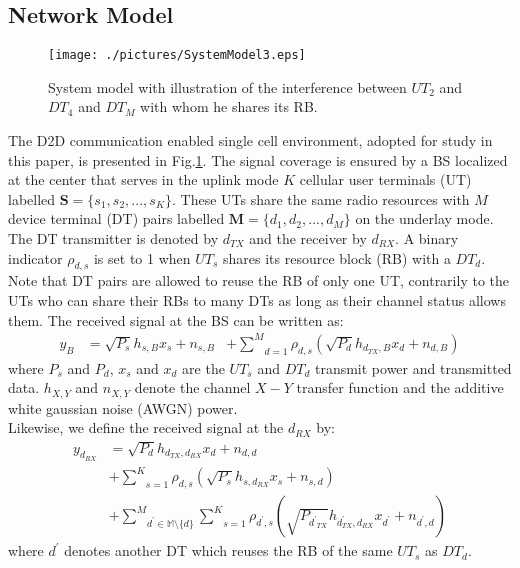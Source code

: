 \documentclass[conference,onecolumn,12pt]{IEEEtran}
\begin{document}
\subsection{Network Model}
\begin{figure}
\centering
\texttt{[image: ./pictures/SystemModel3.eps]}
\caption{System model with illustration of the interference between $UT_2$ and $DT_4$ and $DT_M$ with whom he shares its RB. }\label{SystemModel3}
\end{figure}
The D2D communication enabled single cell environment, adopted for study in this paper, is presented in Fig.\ref{SystemModel3}. The signal coverage is ensured by a BS localized at the center that serves in the uplink mode $K$ cellular user terminals (UT) labelled $\mathbf{S}=\{s_{1},s_{2},...,s_{K}\}$. These UTs share the same radio resources with $M$ device terminal (DT) pairs labelled $\mathbf{M}=\{d_1, d_2,...,d_M\}$ on the underlay mode. The DT transmitter is denoted by $d_{TX}$ and the receiver by $d_{RX}$. A binary indicator $\rho_{d,s}$ is set to 1 when $UT_s$ shares its resource block (RB) with a $DT_d$. Note that DT pairs are allowed to reuse the RB of only one UT, contrarily to the UTs who can share their RBs to many DTs as long as their channel status allows them.
The received signal at the BS can be written as:
\begin{equation} \label{eq1}
\begin{aligned}
{y_B}&=\sqrt{P_s}h_{s,B}x_s+n_{s,B}
&+\underset{d=1} {\overset{M}{\sum}} \rho_{d,s}(\sqrt{P_d}h_{d_{TX},B}x_d+n_{d,B})
\end{aligned}
\end{equation}
where $P_s$ and $P_d$, $x_s$ and $x_d$ are the $UT_s$ and $DT_d$ transmit power and transmitted data. $h_{X,Y}$ and $n_{X,Y}$ denote the channel $X-Y$ transfer function and the additive white gaussian noise (AWGN) power. \\
Likewise, we define the received signal at the $d_{RX}$ by:
\begin{equation} \label{eq2}
\begin{aligned}
y_{d_{RX}}
&=\sqrt{P_d}h_{d_{TX},d_{RX}}x_d+n_{d,d}\\&+ \underset{s=1} {\overset{K}{\sum}} \rho_{d,s}(\sqrt{P_s}h_{s,d_{RX}}x_s+n_{s,d})\\
&+\underset{d^{'}\in \mathbb{M}\setminus \{d\}} {\overset{M}{\sum}}\underset{s=1} {\overset{K}{\sum}} \rho_{d^{'},s}(\sqrt{P_{{d^{'}}_{TX}}}h_{{d^{'}_{TX}},d_{RX}}x_{d^{'}}+n_{{d^{'}},d})\end{aligned}
\end{equation}
where $d^{'}$ denotes another DT which reuses the RB of the same $UT_s$ as $DT_d$.
\end{document}
